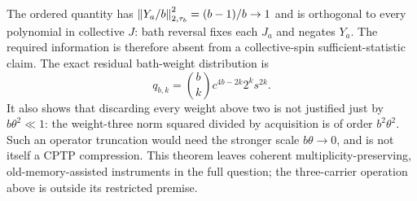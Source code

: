The ordered quantity has $\left\lVert Y_a/b\right\rVert_{2,\tau_b}^2=(b-1)/b\to1$ and
is orthogonal to every polynomial in collective $J$: bath reversal fixes
each $J_a$ and negates $Y_a$. The required information is therefore absent
from a collective-spin sufficient-statistic claim. The exact residual
bath-weight distribution is
\[
 q_{b,k}=\binom bk c^{4b-2k}2^ks^{2k}.
\]
It also shows that discarding every weight above two is not justified just
by $b\theta^2\ll1$: the weight-three norm squared divided by acquisition
is of order $b^2\theta^2$. Such an operator truncation would need the
stronger scale $b\theta\to0$, and is not itself a CPTP compression.
This theorem leaves coherent multiplicity-preserving, old-memory-assisted
instruments in the full question; the three-carrier operation above is
outside its restricted premise.
